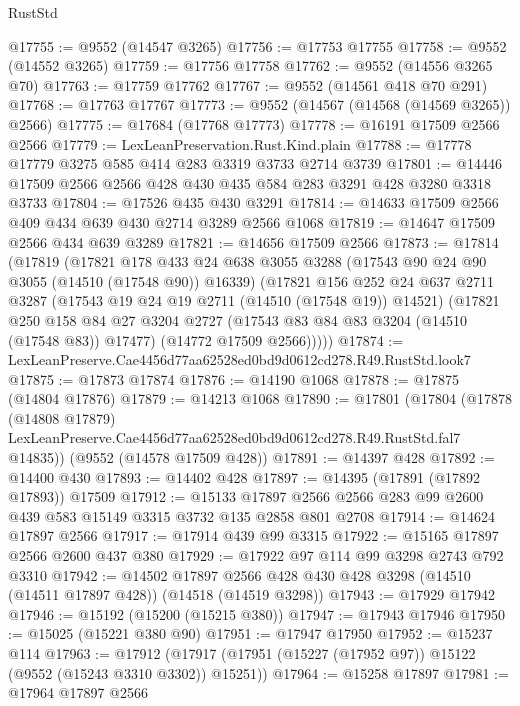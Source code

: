 \begin{lexlean}{RustStd}
\begin{coremodule}
@17755 := @9552 (@14547 @3265)
@17756 := @17753 @17755
@17758 := @9552 (@14552 @3265)
@17759 := @17756 @17758
@17762 := @9552 (@14556 @3265 @70)
@17763 := @17759 @17762
@17767 := @9552 (@14561 @418 @70 @291)
@17768 := @17763 @17767
@17773 := @9552 (@14567 (@14568 (@14569 @3265)) @2566)
@17775 := @17684 (@17768 @17773)
@17778 := @16191 @17509 @2566 @2566
@17779 := LexLeanPreservation.Rust.Kind.plain
@17788 := @17778 @17779 @3275 @585 @414 @283 @3319 @3733 @2714 @3739
@17801 := @14446 @17509 @2566 @2566 @428 @430 @435 @584 @283 @3291 @428 @3280 @3318 @3733
@17804 := @17526 @435 @430 @3291
@17814 := @14633 @17509 @2566 @409 @434 @639 @430 @2714 @3289 @2566 @1068
@17819 := @14647 @17509 @2566 @434 @639 @3289
@17821 := @14656 @17509 @2566
@17873 := @17814
    (@17819
      (@17821
        @178
        @433
        @24
        @638
        @3055
        @3288
        (@17543 @90 @24 @90 @3055 (@14510 (@17548 @90)) @16339)
        (@17821
          @156
          @252
          @24
          @637
          @2711
          @3287
          (@17543 @19 @24 @19 @2711 (@14510 (@17548 @19)) @14521)
          (@17821
            @250
            @158
            @84
            @27
            @3204
            @2727
            (@17543 @83 @84 @83 @3204 (@14510 (@17548 @83)) @17477)
            (@14772 @17509 @2566)))))
@17874 := LexLeanPreserve.Cae4456d77aa62528ed0bd9d0612cd278.R49.RustStd.look7
@17875 := @17873 @17874
@17876 := @14190 @1068
@17878 := @17875 (@14804 @17876)
@17879 := @14213 @1068
@17890 := @17801
    (@17804
      (@17878
        (@14808 @17879)
        LexLeanPreserve.Cae4456d77aa62528ed0bd9d0612cd278.R49.RustStd.fal7
        @14835))
    (@9552 (@14578 @17509 @428))
@17891 := @14397 @428
@17892 := @14400 @430
@17893 := @14402 @428
@17897 := @14395 (@17891 (@17892 @17893)) @17509
@17912 := @15133
    @17897
    @2566
    @2566
    @283
    @99
    @2600
    @439
    @583
    @15149
    @3315
    @3732
    @135
    @2858
    @801
    @2708
@17914 := @14624 @17897 @2566
@17917 := @17914 @439 @99 @3315
@17922 := @15165 @17897 @2566 @2600 @437 @380
@17929 := @17922 @97 @114 @99 @3298 @2743 @792 @3310
@17942 := @14502
    @17897
    @2566
    @428
    @430
    @428
    @3298
    (@14510 (@14511 @17897 @428))
    (@14518 (@14519 @3298))
@17943 := @17929 @17942
@17946 := @15192 (@15200 (@15215 @380))
@17947 := @17943 @17946
@17950 := @15025 (@15221 @380 @90)
@17951 := @17947 @17950
@17952 := @15237 @114
@17963 := @17912 (@17917 (@17951 (@15227 (@17952 @97)) @15122 (@9552 (@15243 @3310 @3302)) @15251))
@17964 := @15258 @17897
@17981 := @17964
    @17897
    @2566

\end{coremodule}
\end{lexlean}
